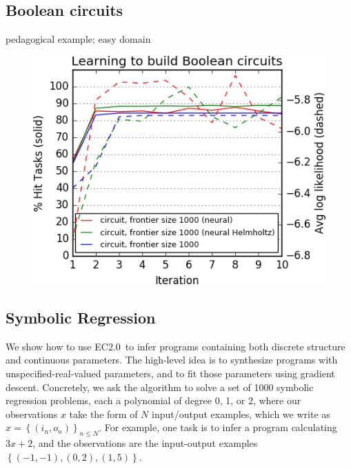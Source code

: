 \documentclass{article}
\newcommand{\system}{EC2.0~}
\begin{document}
\subsection{Boolean circuits}
pedagogical example; easy domain
\begin{figure}
  \includegraphics[width = \columnwidth]{figures/circuit.png} 
\end{figure}

\subsection{Symbolic Regression}\label{regressionSection}
We show how to use \system to infer programs containing both discrete
structure and continuous parameters. The high-level idea is to synthesize programs with unspecified-real-valued parameters, and to fit those parameters using gradient descent.
Concretely, we ask the algorithm to
solve a set of 1000 symbolic regression problems, each a polynomial of
degree 0, 1, or 2, where our observations $x$ take the form of $N$
input/output examples, which we write as $x = \left\{(i_n,o_n)
\right\}_{n\leq N}$. For example, one task is to infer a program
calculating $3x + 2$, and the observations are the input-output
examples $\left\{(-1,-1),(0,2),(1,5) \right\}$.
\end{document}
